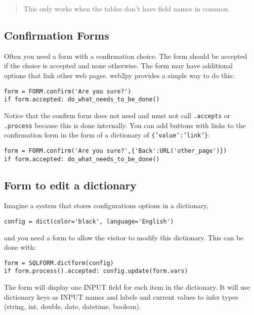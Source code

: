 \documentclass[justified,sixbynine,notoc]{tufte-book}
\def\ft{\small\tt}
\def\inxx#1{\index{#1}}
\begin{document}
\begin{fullwidth}
\begin{quote}This only works when the tables don't have field names in common.\end{quote}
\goodbreak\subsection{Confirmation Forms}

\inxx{confirm}

Often you need a form with a confirmation choice. The form should be accepted if the choice is accepted and none otherwise. The form may have additional options that link other web pages. web2py provides a simple way to do this:

\begin{lstlisting}
form = FORM.confirm('Are you sure?')
if form.accepted: do_what_needs_to_be_done()
\end{lstlisting}

Notice that the confirm form does not need and must not call {\ft .accepts} or {\ft .process} because this is done internally. You can add buttons with links to the confirmation form in the form of a dictionary of {\ft \{'value':'link'\}}:

\begin{lstlisting}
form = FORM.confirm('Are you sure?',{'Back':URL('other_page')})
if form.accepted: do_what_needs_to_be_done()
\end{lstlisting}

\goodbreak\subsection{Form to edit a dictionary}

Imagine a system that stores configurations options in a dictionary,

\begin{lstlisting}
config = dict(color='black', language='English')
\end{lstlisting}
\noindent and you need a form to allow the visitor to modify this dictionary.
This can be done with:

\begin{lstlisting}
form = SQLFORM.dictform(config)
if form.process().accepted: config.update(form.vars)
\end{lstlisting}

The form will display one INPUT field for each item in the dictionary. It will use dictionary keys as INPUT names and labels and current values to infer types (string, int, double, date, datetime, boolean).


\end{fullwidth}
\end{document}
